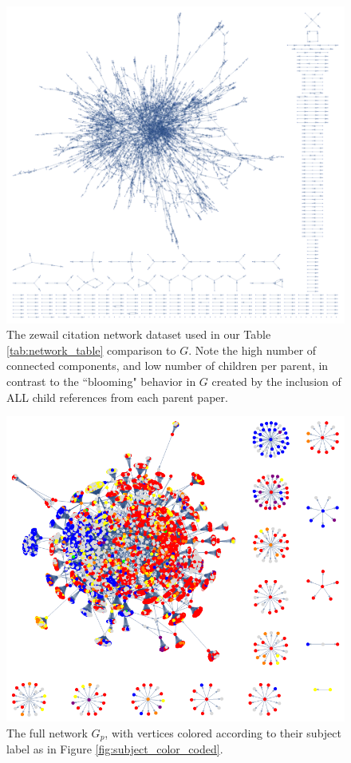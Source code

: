 \documentclass[12pt]{thesis}
\theoremstyle{plain}
\theoremstyle{definition}
\theoremstyle{remark}
\begin{document}
\begin{figure}[H]
\centering
\includegraphics[width=\textwidth]{display_zewail.png}
\caption{The zewail citation network dataset used in our Table \ref{tab:network_table} comparison to $G$. Note the high number of connected components, and low number of children per parent, in contrast to the ``blooming" behavior in $G$ created by the inclusion of ALL child references from each parent paper.}
\label{fig:zewail}
\end{figure}

\begin{figure}[H]
\centering
\includegraphics[width=\textwidth]{full_network_color_coded.png}
\caption{The full network $G_p$, with vertices colored according to their subject label as in Figure \ref{fig:subject_color_coded}.}
\label{fig:full_subject_color_coded}
\end{figure}
\end{document}
